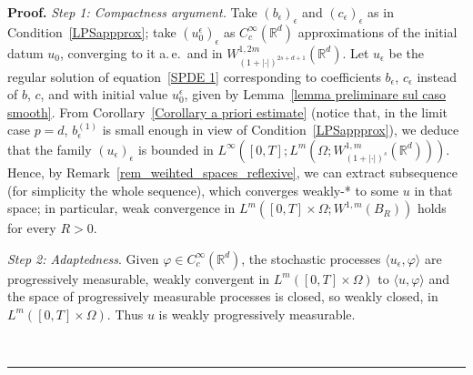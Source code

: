 \documentclass[a4paper,10pt]{article}
\newenvironment{proof}[1][Proof]{\noindent\textbf{#1.} }{\ \rule{0.5em}{0.5em}}
\newcommand{\mr}{\mathbb{R}}
\newcommand{\eps}{\epsilon}
\begin{document}
\begin{proof}
\emph{Step 1: Compactness argument.} Take $(b_\eps)_\eps$ and $(c_\eps)_\eps$ as in Condition~\ref{LPSappprox}; take $(u_0^\eps)_\eps$ as $C^\infty_c(\mr^d)$ approximations of the initial datum $u_0$, converging to it a.\,e.\ and in $W_{(1+|\cdot|)^{2s+d+1}}^{1,2m}(\mr^d)$. Let $u_\eps$ be the regular solution of equation~\eqref{SPDE 1} corresponding to coefficients $b_\eps$, $c_\eps$ instead of $b$, $c$, and with initial value $u_0^\eps$, given by Lemma~\ref{lemma preliminare sul caso smooth}. From Corollary~\ref{Corollary a priori estimate} (notice that, in the limit case 
$p=d$, $b_\eps^{(1)}$ is small enough in view of Condition~\ref{LPSappprox}), we deduce that the family $(u_\eps)_\eps$ is bounded in $L^\infty([0,T];L^m(\Omega;W^{1,m}_{(1+|\cdot|)^{s}}(\mr^d)))$. Hence, by Remark~\ref{rem_weihted_spaces_reflexive}, we can extract subsequence (for simplicity the whole sequence), which converges weakly-* to some $u$ in that space; in particular, weak convergence in 
$L^m([0,T]\times\Omega;W^{1,m}(B_R))$ holds for every $R>0$.

\emph{Step 2: Adaptedness}. Given $\varphi\in C_{c}^{\infty}(\mathbb{R}^{d})$, the
stochastic processes $\langle u_{\epsilon},\varphi\rangle$ are
progressively measurable, weakly convergent in $L^{m}([0,T]\times\Omega)$ to
$\langle u,\varphi\rangle$ and the space of progressively measurable processes
is closed, so weakly closed, in $L^{m}([0,T]\times\Omega)$. Thus $u$ is weakly
progressively measurable.


\end{proof}
\end{document}

